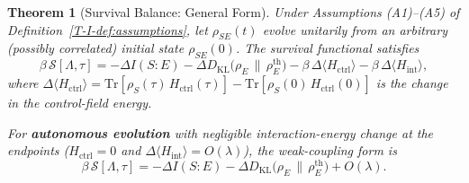 \documentclass[12pt,a4paper,openany]{book}
\newtheorem{theorem}{Theorem}[chapter]
\begin{document}
\begin{theorem}[Survival Balance: General Form]
\label{T-I-thm:advantage}
Under Assumptions \textup{(A1)--(A5)} of
Definition~\ref{T-I-def:assumptions},
let $\rho_{SE}(t)$ evolve unitarily from an \emph{arbitrary}
(possibly correlated) initial state $\rho_{SE}(0)$.
The survival functional
satisfies
\begin{equation}
\label{T-I-eq:advantage}
\boxed{\;
\beta\,\mathcal{S}[\Lambda,\tau]
= -\Delta I(S{:}E)
  - \Delta D_{\mathrm{KL}}\!\bigl(\rho_E \,\big\|\,
    \rho_E^{\mathrm{th}}\bigr)
  - \beta\,\Delta\langle H_{\mathrm{ctrl}} \rangle
  - \beta\,\Delta\langle H_{\mathrm{int}} \rangle,
\;}
\end{equation}
where $\Delta\langle H_{\mathrm{ctrl}} \rangle
= \mathrm{Tr}[\rho_S(\tau)\, H_{\mathrm{ctrl}}(\tau)]
  - \mathrm{Tr}[\rho_S(0)\, H_{\mathrm{ctrl}}(0)]$
is the change in the control-field energy.

For \textbf{autonomous evolution} with negligible interaction-energy
change at the endpoints
($H_{\mathrm{ctrl}} = 0$ and
$\Delta\langle H_{\mathrm{int}}\rangle=O(\lambda)$),
the weak-coupling form is
\begin{equation}
\label{T-I-eq:advantage_auto}
\beta\,\mathcal{S}[\Lambda,\tau]
= -\Delta I(S{:}E)
  - \Delta D_{\mathrm{KL}}\!\bigl(\rho_E \,\big\|\,
    \rho_E^{\mathrm{th}}\bigr)+O(\lambda).
\end{equation}
\end{theorem}
\end{document}
